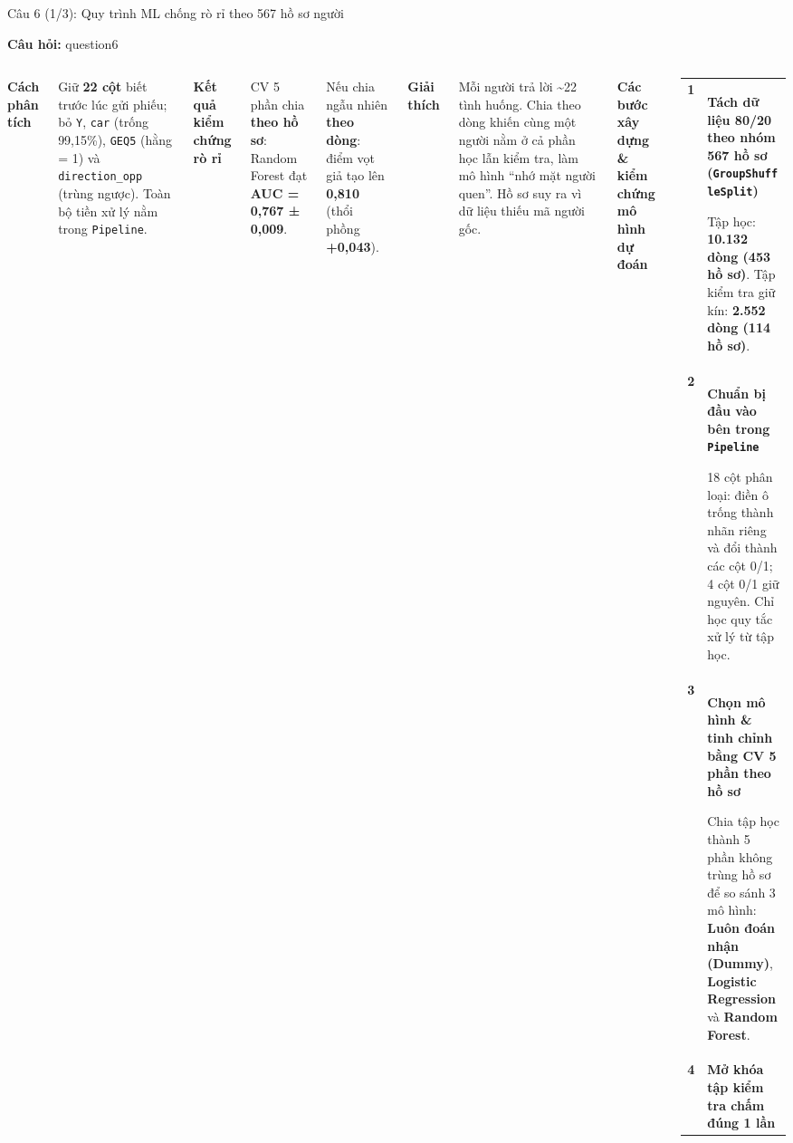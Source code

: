 \documentclass[aspectratio=169,12pt]{beamer}
\newcommand{\SlideOwner}{}
\newcommand{\Owner}[1]{\renewcommand{\SlideOwner}{#1}}
\newcommand{\QBlock}[2]{%
  {\fontsize{14.5}{18}\selectfont\bfseries\color{Accent} #1\par}\vspace{1.2mm}
  {\fontsize{12.8}{17.2}\selectfont\raggedright #2\par}\vspace{3.4mm}}
\newcommand{\QLine}[1]{%
  {\fontsize{12}{15.8}\selectfont\itshape\color{Muted}\raggedright\textbf{Câu hỏi:} \csname question#1\endcsname\par}\vspace{3.2mm}}
\newcommand{\Point}[1]{#1\par\vspace{2mm}}
\begin{document}
\Owner{Hoàng Công Lý}
\begin{frame}[t]{Câu 6 (1/3): Quy trình ML chống rò rỉ theo 567 hồ sơ người}
  \QLine{6}
  \begin{columns}[T,onlytextwidth]
      \QBlock{Cách phân tích}{Giữ \textbf{22 cột} biết trước lúc gửi phiếu; bỏ \texttt{Y}, \texttt{car} (trống 99,15\%), \texttt{GEQ5} (hằng = 1) và \texttt{direction\_opp} (trùng ngược). Toàn bộ tiền xử lý nằm trong \texttt{Pipeline}.}
      \QBlock{Kết quả kiểm chứng rò rỉ}{
        \Point{CV 5 phần chia \textbf{theo hồ sơ}: Random Forest đạt \textbf{AUC = 0,767 ± 0,009}.}
        Nếu chia ngẫu nhiên \textbf{theo dòng}: điểm vọt giả tạo lên \textbf{0,810} (thổi phồng \textbf{+0,043}).}
      \QBlock{Giải thích}{Mỗi người trả lời \textasciitilde 22 tình huống. Chia theo dòng khiến cùng một người nằm ở cả phần học lẫn kiểm tra, làm mô hình ``nhớ mặt người quen''. Hồ sơ suy ra vì dữ liệu thiếu mã người gốc.}
      {\fontsize{16}{20}\selectfont\bfseries Các bước xây dựng \& kiểm chứng mô hình dự đoán\par}\vspace{5mm}
      {\fontsize{13.8}{19.5}\selectfont\renewcommand{\arraystretch}{1.28}
      \begin{tabular}{@{}p{13mm}>{\raggedright\arraybackslash}p{178mm}@{}}
        \textcolor{Accent}{\textbf{1}} & \textbf{Tách dữ liệu 80/20 theo nhóm 567 hồ sơ (\texttt{GroupShuffleSplit})}\par
        Tập học: \textbf{10.132 dòng (453 hồ sơ)}. Tập kiểm tra giữ kín: \textbf{2.552 dòng (114 hồ sơ)}.\\[5mm]
        \textcolor{Accent}{\textbf{2}} & \textbf{Chuẩn bị đầu vào bên trong \texttt{Pipeline}}\par
        18 cột phân loại: điền ô trống thành nhãn riêng và đổi thành các cột 0/1; 4 cột 0/1 giữ nguyên. Chỉ học quy tắc xử lý từ tập học.\\[5mm]
        \textcolor{Accent}{\textbf{3}} & \textbf{Chọn mô hình \& tinh chỉnh bằng CV 5 phần theo hồ sơ}\par
        Chia tập học thành 5 phần không trùng hồ sơ để so sánh 3 mô hình: \textbf{Luôn đoán nhận (Dummy)}, \textbf{Logistic Regression} và \textbf{Random Forest}.\\[5mm]
        \textcolor{Accent}{\textbf{4}} & \textbf{Mở khóa tập kiểm tra chấm đúng 1 lần}\par

\end{tabular}}
\end{columns}
\end{frame}
\end{document}
